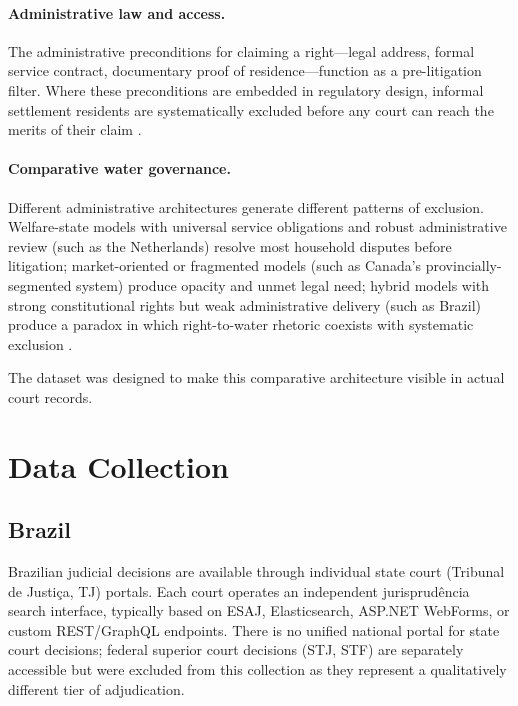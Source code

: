 \documentclass[12pt]{article}
\begin{document}
\paragraph{Administrative law and access.} The administrative preconditions for claiming a right—legal address, formal service contract, documentary proof of residence—function as a pre-litigation filter. Where these preconditions are embedded in regulatory design, informal settlement residents are systematically excluded before any court can reach the merits of their claim \citep{tokman2001,varley2013}.

\paragraph{Comparative water governance.} Different administrative architectures generate different patterns of exclusion. Welfare-state models with universal service obligations and robust administrative review (such as the Netherlands) resolve most household disputes before litigation; market-oriented or fragmented models (such as Canada's provincially-segmented system) produce opacity and unmet legal need; hybrid models with strong constitutional rights but weak administrative delivery (such as Brazil) produce a paradox in which right-to-water rhetoric coexists with systematic exclusion \citep{castro2004,bakker2007}.

The dataset was designed to make this comparative architecture visible in actual court records.

\section{Data Collection}

\subsection{Brazil}

Brazilian judicial decisions are available through individual state court (Tribunal de Justiça, TJ) portals. Each court operates an independent jurisprudência search interface, typically based on ESAJ, Elasticsearch, ASP.NET WebForms, or custom REST/GraphQL endpoints. There is no unified national portal for state court decisions; federal superior court decisions (STJ, STF) are separately accessible but were excluded from this collection as they represent a qualitatively different tier of adjudication.
\end{document}
